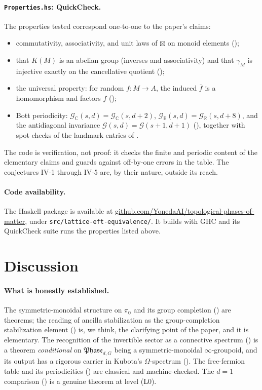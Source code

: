 \documentclass[12pt]{article}
\newcommand{\Phase}{\mathfrak{Phase}}          %
\newcommand{\Groth}{K}                       %
\theoremstyle{definition}
\theoremstyle{remark}
\theoremstyle{plain}
\begin{document}
\paragraph{\texttt{Properties.hs}: QuickCheck.} The properties tested correspond
one-to-one to the paper's claims:
\begin{itemize}
\item commutativity, associativity, and unit laws of $\boxtimes$ on monoid
  elements ();
\item that $\Groth(M)$ is an abelian group (inverses and associativity) and that
  $\gamma_M$ is injective exactly on the cancellative quotient
  ();
\item the universal property: for random $f:M\to A$, the induced $\bar f$ is a
  homomorphism and factors $f$ ();
\item Bott periodicity: $\mathcal G_{\mathbb C}(s,d)=\mathcal G_{\mathbb C}(s,d+2)$,
  $\mathcal G_{\mathbb R}(s,d)=\mathcal G_{\mathbb R}(s,d+8)$, and the antidiagonal
  invariance $\mathcal G(s,d)=\mathcal G(s+1,d+1)$ (), together
  with spot checks of the landmark entries of .
\end{itemize}
The code is verification, not proof: it checks the finite and periodic content of
the elementary claims and guards against off-by-one errors in the table. The
conjectures IV-1 through IV-5 are, by their nature, outside its reach.

\paragraph{Code availability.} The Haskell package is available at
\href{https://github.com/YonedaAI/topological-phases-of-matter}{github.com/YonedaAI/topological-phases-of-matter},
under \texttt{src/\allowbreak lattice-eft-\allowbreak equivalence/}. It builds
with GHC and its QuickCheck suite runs the properties listed above.

\section{Discussion}
\label{sec:discussion}

\paragraph{What is honestly established.} The symmetric-monoidal structure on
$\pi_0$ and its group completion () are
theorems; the reading of ancilla stabilization as the group-completion
stabilization element () is, we think, the clarifying point
of the paper, and it is elementary. The recognition of the invertible sector as a
connective spectrum () is a theorem \emph{conditional} on
$\Phase_{d,G}$ being a symmetric-monoidal $\infty$-groupoid, and its output has a
rigorous carrier in Kubota's $\Omega$-spectrum (). The
free-fermion table and its periodicities () are classical and
machine-checked. The $d=1$ comparison () is a genuine theorem at
level (L0).
\end{document}
